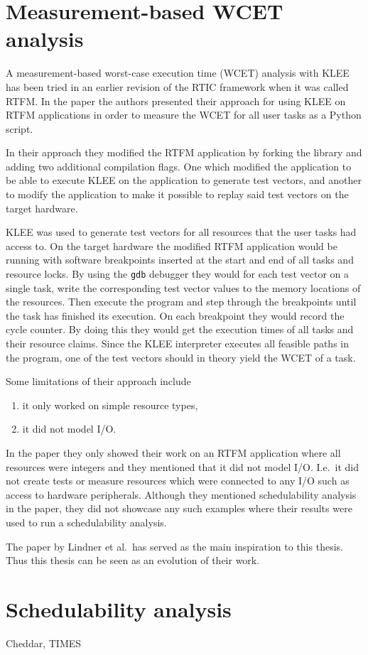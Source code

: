\section{Measurement-based WCET analysis}
A measurement-based worst-case execution time (WCET) analysis with KLEE has
been tried in an earlier revision of the RTIC framework\cite{lindner} when it
was called RTFM. In the paper the authors presented their approach for using
KLEE on RTFM applications in order to measure the WCET for all user tasks as a
Python script.

In their approach they modified the RTFM application by forking the library and
adding two additional compilation flags. One which modified the application to be
able to execute KLEE on the application to generate test vectors, and another
to modify the application to make it possible to replay said test vectors on
the target hardware.

KLEE was used to generate test vectors for all resources that the user tasks
had access to. On the target hardware the modified RTFM application would be
running with software breakpoints inserted at the start and end of all tasks
and resource locks. By using the \texttt{gdb} debugger they would for each test
vector on a single task, write the corresponding test vector values to the
memory locations of the resources. Then execute the program and step through the
breakpoints until the task has finished its execution. On each breakpoint
they would record the cycle counter. By doing this they would get the execution
times of all tasks and their resource claims. Since the KLEE interpreter
executes all feasible paths in the program, one of the test vectors should
in theory yield the WCET of a task.

Some limitations of their approach include
\begin{enumerate}
    \item it only worked on simple resource types,
    \item it did not model I/O.
\end{enumerate}
In the paper they only showed their work on an RTFM application where all
resources were integers and they mentioned that it did not model I/O. I.e.\
it did not create tests or measure resources which were connected to any I/O
such as access to hardware peripherals. Although they mentioned schedulability
analysis in the paper, they did not showcase any such examples where their
results were used to run a schedulability analysis.

The paper by Lindner et al.\ has served as the main inspiration to this thesis.
Thus this thesis can be seen as an evolution of their work.

\section{Schedulability analysis}
Cheddar, TIMES
